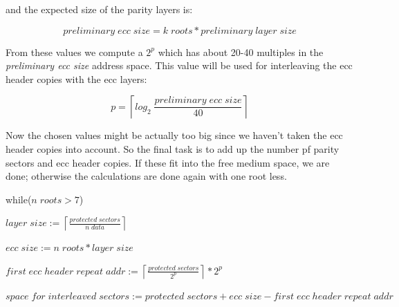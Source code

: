 and the expected size of the parity layers is:

\[preliminary\; ecc\; size = k\; roots * preliminary\; layer\; size\]

\smallskip

From these values we compute a $2^p$ which has about 20-40 multiples
in the {\em preliminary ecc size} address space. This value will be used
for interleaving the ecc header copies with the ecc layers:

\[ p = \left\lceil log_2\; \frac{preliminary\;ecc\;size}{40} \right\rceil \]



\smallskip

Now the chosen values might be actually too big since we haven't taken
the ecc header copies into account. 
So the final task is to add up the number pf parity sectors and ecc header
copies. If these fit into the free medium space, we are done; otherwise
the calculations are done again with one root less.

\newpage

\bigskip

while($n\; roots > 7$)

\smallskip

\quad $layer\; size := \left\lceil\frac{protected\; sectors}{n\; data}\right\rceil$

\smallskip

\quad $ecc\; size := n\; roots * layer\; size$

\smallskip

\quad $first\; ecc\; header\; repeat\; addr := \left\lceil\frac{protected\; sectors}{2^p}\right\rceil * 2^p$ 

\smallskip

\quad $space\; for\; interleaved\; sectors := protected\; sectors + ecc\; size - first\; ecc\; header\; repeat\; addr$

